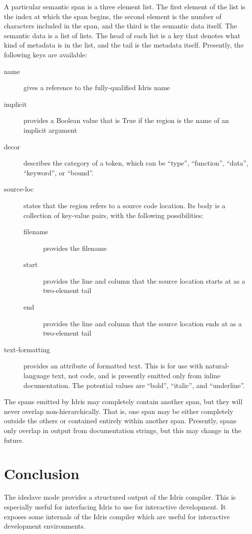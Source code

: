 \documentclass{article}
\begin{document}
A particular semantic span is a three element list.
The first element of the list is the index at which the span begins, the second element is the number of characters included in the span, and the third is the semantic data itself.
The semantic data is a list of lists.
The head of each list is a key that denotes what kind of metadata is in the list, and the tail is the metadata itself.
Presently, the following keys are available:
\begin{description}
\item[name] gives a reference to the fully-qualified Idris name
\item[implicit] provides a Boolean value that is True if the region is the name of an implicit argument
\item[decor] describes the category of a token, which can be ``type'', ``function'', ``data'', ``keyword'', or ``bound''.
\item[source-loc] states that the region refers to a source code location. Its body is a collection of key-value pairs, with the following possibilities:
  \begin{description}
  \item[filename] provides the filename
  \item[start] provides the line and column that the source location starts at as a two-element tail
  \item[end]  provides the line and column that the source location ends at as a two-element tail
  \end{description}
\item[text-formatting] provides an attribute of formatted text. This is for use with natural-language text, not code, and is presently emitted only from inline documentation. The potential values are ``bold'', ``italic'', and ``underline''.

\end{description}

The spans emitted by Idris may completely contain another span, but they will never overlap non-hierarchically. That is, one span may be either completely outside the others or contained entirely within another span.
Presently, spans only overlap in output from documentation strings, but this may change in the future.

\section{Conclusion}
The ideslave mode provides a structured output of the Idris compiler.
This is especially useful for interfacing Idris to use for interactive development.
It exposes some internals of the Idris compiler which are useful for interactive development environments.
\end{document}
